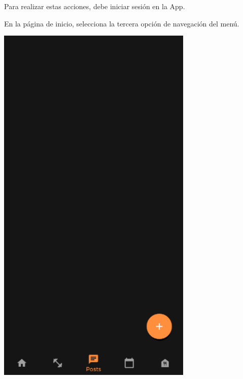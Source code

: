 \documentclass[12pt,a4paper]{article}
\begin{document}
\begin{enumerate}
\item Para realizar estas acciones, debe iniciar sesión en la App.

\begin{minipage}{.60\textwidth}
  \item En la página de inicio, selecciona la tercera opción de navegación del menú.  
\end{minipage}
\begin{minipage}{.40\textwidth}
  \includegraphics[width=0.7\textwidth, right]{postpage}
\end{minipage}



\end{enumerate}
\end{document}
